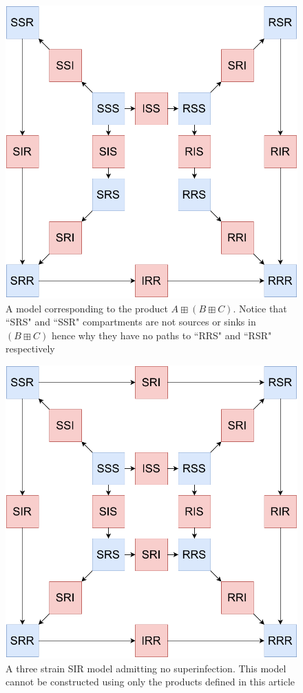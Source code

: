 \documentclass{article}
\theoremstyle{definition}
\begin{document}
\begin{figure}
    \centering
    \includegraphics[width=\textwidth]{images_pdf/Three_strain_SIR_no_super_2.pdf}
    \caption{A model corresponding to the product $A\boxplus (B\boxplus C)$. Notice that “SRS" and “SSR" compartments are not sources or sinks in $(B\boxplus C)$ hence why they have no paths to “RRS" and “RSR" respectively}
    \label{fig:wp_nonasoc}
\end{figure}

\begin{figure}
    \centering
    \includegraphics[width=\textwidth]{images_pdf/Three_strain_SIR_no_super_actual.pdf}
    \caption{A three strain SIR model admitting no superinfection. This model cannot be constructed using only the products defined in this article}
    \label{fig:ms_ns_3d}
\end{figure}
\end{document}
